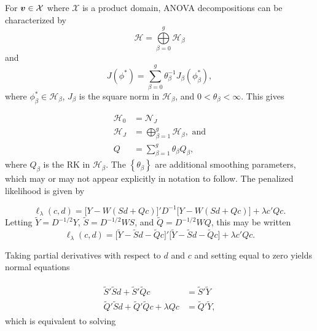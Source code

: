 \documentclass[12pt]{article}
\newcommand{\Hilbert}{\mathcal{H}}
\newcommand{\tildeS}{\tilde{S}}
\newcommand{\tildeY}{\tilde{Y}}
\newcommand{\tildeQ}{\tilde{Q}}
\newcommand{\bfv}{\mbox{\boldmath $v$}}
\theoremstyle{definition}
\begin{document}
For $\bfv \in \mathcal{X}$ where $\mathcal{X}$ is a product domain, ANOVA decompositions can be characterized by 
\begin{equation*}
\Hilbert = \bigoplus\limits_{\beta=0}^{g} \Hilbert_\beta
\end{equation*}
\noindent
and
\begin{equation*}
J\left(\phi^*\right) = \sum_{\beta=0}^{g} \theta^{-1}_\beta J_\beta \left( \phi^*_\beta \right),
\end{equation*}
\noindent
where $\phi^*_\beta \in \Hilbert_\beta$, $J_\beta$ is the square norm in $\Hilbert_\beta$, and $0 < \theta_\beta < \infty$. This gives 

\begin{align*}
\Hilbert_0 &= \mathcal{N}_J \\
\Hilbert_J &= \bigoplus\limits_{\beta=1}^{g} \Hilbert_\beta, \mbox{ and} \\
Q &= \sum_{\beta=1}^g \theta_\beta Q_\beta,
\end{align*}
\noindent
where $Q_\beta$ is the RK in $\Hilbert_\beta$. The $\left \{ \theta_\beta \right\}$ are additional smoothing parameters, which may or may not appear explicitly in notation to follow. 
\bigskip
The penalized likelihood is given by 

\begin{equation}
\ell_\lambda \left(c, d \right) = \bigg[ Y - W \left(Sd + Qc\right)\bigg]' D^{-1}\bigg[ Y - W \left(Sd + Qc\right)\bigg] + \lambda c'Qc.
\end{equation}
\bigskip
\noindent
Letting $\tildeY = D^{-1/2} Y$, $\tildeS = D^{-1/2} W S$, and $\tildeQ = D^{-1/2} W Q$, this may be written
\begin{equation}
\ell_\lambda \left(c, d \right) = \bigg[ \tildeY - \tildeS d - \tildeQ c\bigg]'\bigg[ \tildeY - \tildeS d - \tildeQ c\bigg] + \lambda c'Qc.
\end{equation}

Taking partial derivatives with respect to $d$ and $c$ and setting equal to zero yields normal equations 

\begin{align}
\begin{split}
\tildeS'\tildeS d + \tildeS'\tildeQ c &= \tildeS' \tildeY \\
\tildeQ'\tildeS d + \tildeQ'\tildeQ c + \lambda Q c &= \tildeQ' \tildeY, 
\end{split}
\end{align}
\bigskip
\noindent
which is equivalent to solving 
\end{document}
